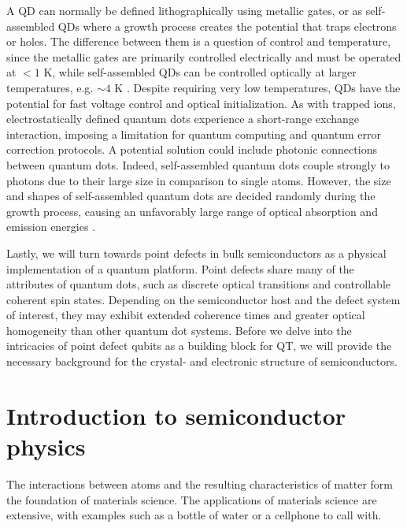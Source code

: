 A QD can normally be defined lithographically using metallic gates, or as self-assembled QDs where a growth process creates the potential that traps electrons or holes. The difference between them is a question of control and temperature, since the metallic gates are primarily controlled electrically and must be operated at $<1$ K, while self-assembled QDs can be controlled optically at larger temperatures, e.g.  $\sim 4$ K \cite{Ladd2010}. %
Despite requiring very low temperatures, QDs have the potential for fast voltage control and optical initialization. As with trapped ions, electrostatically defined quantum dots experience a short-range exchange interaction, imposing a limitation for quantum computing and quantum error correction protocols. A potential solution could include photonic connections between quantum dots. Indeed, self-assembled quantum dots couple strongly to photons due to their large size in comparison to single atoms. However, the size and shapes of self-assembled quantum dots are decided randomly during the growth process, causing an unfavorably large range of optical absorption and emission energies \cite{Ladd2010}.




Lastly, we will turn towards point defects in bulk semiconductors as a physical implementation of a quantum platform. Point defects share many of the attributes of quantum dots, such as discrete optical transitions and controllable coherent spin states. %
Depending on the semiconductor host and the defect system of interest, they may exhibit extended coherence times and greater optical homogeneity than other quantum dot systems. Before we delve into the intricacies of point defect qubits as a building block for QT, we will provide the necessary background for the crystal- and electronic structure of semiconductors.   %

\section{Introduction to semiconductor physics}

The interactions between atoms and the resulting characteristics of matter form the foundation of materials science. The applications of materials science are extensive, with examples such as a bottle of water or a cellphone to call with.

